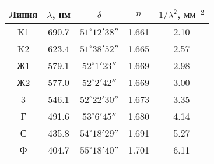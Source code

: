 \begin{tabular}{ccccc}
\toprule
Линия & $\lambda$, нм & $\delta$ & $n$ & $1/\lambda^2$, $\text{мм}^{-2}$ \\
\midrule
K1 & 690.7 & $51 ^\circ 12 ' 38 ''$ & 1.661 & 2.10 \\
K2 & 623.4 & $51 ^\circ 38 ' 52 ''$ & 1.665 & 2.57 \\
Ж1 & 579.1 & $52 ^\circ 1  ' 23 ''$ & 1.669 & 2.98 \\
Ж2 & 577.0 & $52 ^\circ 2  ' 42 ''$ & 1.669 & 3.00 \\
3  & 546.1 & $52 ^\circ 22 ' 30 ''$ & 1.673 & 3.35 \\
Г  & 491.6 & $53 ^\circ 6  ' 45 ''$ & 1.680 & 4.14 \\
С  & 435.8 & $54 ^\circ 18 ' 29 ''$ & 1.691 & 5.27 \\
Ф  & 404.7 & $55 ^\circ 18 ' 40 ''$ & 1.701 & 6.11 \\
\bottomrule
\end{tabular}
